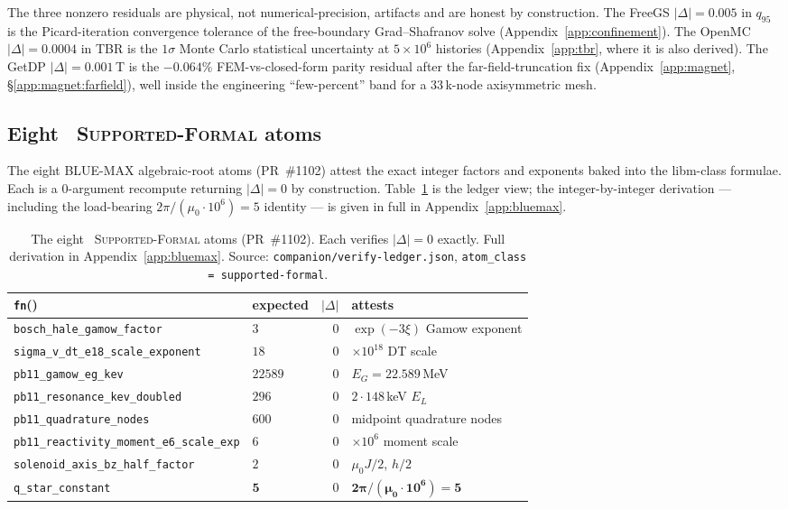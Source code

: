 The three nonzero residuals are physical, not numerical-precision,
artifacts and are honest by construction. The FreeGS $|\Delta|=0.005$ in
$q_{95}$ is the Picard-iteration convergence tolerance of the
free-boundary Grad--Shafranov solve (Appendix~\ref{app:confinement}). The
OpenMC $|\Delta|=0.0004$ in TBR is the $1\sigma$ Monte Carlo statistical
uncertainty at $5\times10^{6}$ histories
(Appendix~\ref{app:tbr}, where it is also derived). The GetDP
$|\Delta|=0.001$\,T is the $-0.064\%$ FEM-vs-closed-form parity residual
after the far-field-truncation fix (Appendix~\ref{app:magnet},
\S\ref{app:magnet:farfield}), well inside the engineering ``few-percent''
band for a $33\,$k-node axisymmetric mesh.

\subsection{Eight \tierBlue\ \textsc{Supported-Formal} atoms}
\label{app:verify-ledger:blue}

The eight BLUE-MAX algebraic-root atoms (PR~\#1102) attest the exact
integer factors and exponents baked into the libm-class formulae. Each
is a $0$-argument recompute returning $|\Delta|=0$ by construction.
Table~\ref{tab:app:ledger:blue} is the ledger view; the
integer-by-integer derivation --- including the load-bearing
$2\pi/(\mu_0\!\cdot\!10^{6})=5$ identity --- is given in full in
Appendix~\ref{app:bluemax}.

\begin{table}[h]
\centering
\scriptsize
\setlength{\tabcolsep}{4pt}
\begin{tabular}{@{}llrl@{}}
\toprule
\texttt{fn}() & expected & $|\Delta|$ & attests \\
\midrule
\verb|bosch_hale_gamow_factor|             & $3$     & $0$ & $\exp(-3\xi)$ Gamow exponent \\
\verb|sigma_v_dt_e18_scale_exponent|       & $18$    & $0$ & $\times10^{18}$ DT scale \\
\verb|pb11_gamow_eg_kev|                   & $22589$ & $0$ & $E_G=22.589$\,MeV \\
\verb|pb11_resonance_kev_doubled|          & $296$   & $0$ & $2\!\cdot\!148$\,keV $E_L$ \\
\verb|pb11_quadrature_nodes|               & $600$   & $0$ & midpoint quadrature nodes \\
\verb|pb11_reactivity_moment_e6_scale_exp| & $6$     & $0$ & $\times10^{6}$ moment scale \\
\verb|solenoid_axis_bz_half_factor|        & $2$     & $0$ & $\mu_0 J/2$, $h/2$ \\
\verb|q_star_constant|                     & $\mathbf{5}$ & $0$ & $\mathbf{2\pi/(\mu_0\!\cdot\!10^{6})=5}$ \\
\bottomrule
\end{tabular}
\caption{The eight \tierBlue\ \textsc{Supported-Formal} atoms
(PR~\#1102). Each verifies $|\Delta|=0$ exactly. Full derivation in
Appendix~\ref{app:bluemax}. Source:
\texttt{companion/verify-ledger.json}, \texttt{atom\_class =
supported-formal}.}
\label{tab:app:ledger:blue}
\end{table}

